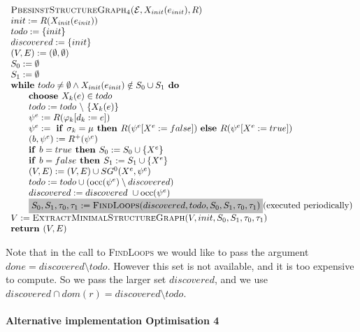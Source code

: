 \documentclass{article}
\newcommand{\Space}{\text{\ }}
\newcommand{\If}{\text{\textbf{if }}}
\newcommand{\Do}{\text{\textbf{ do }}}
\newcommand{\Then}{\text{\textbf{ then }}}
\newcommand{\Else}{\text{\textbf{else }}}
\newcommand{\While}{\text{\textbf{while }}}
\newcommand{\Choose}{\text{\textbf{choose }}}
\newcommand{\Return}{\text{\textbf{return }}}
\begin{document}
\begin{equation*}
\begin{array}{l}
\textsc{PbesinstStructureGraph$_{4}$(}\mathcal{E}, X_{init}(e_{init}), R) \\ 
init:=R(X_{init}(e_{init})) \\
todo:=\{init\} \\
discovered:=\{init\} \\
(V,E) :=(\emptyset ,\emptyset ) \\ 
S_0:= \emptyset \\
S_1:= \emptyset \\
\While todo \neq \emptyset \wedge X_{init}(e_{init}) \notin S_0 \cup S_1 \Do \\ 
\qquad \Choose X_{k}(e)\in todo \\ 
\qquad todo:=todo\ \backslash \ \{X_{k}(e)\} \\ 
\qquad \psi ^{e}:=R(\varphi _{k}[d_{k}:=e]) \\ 
\qquad \psi^e := \Space \If \sigma_k = \mu \Then R(\psi^e[X^e := false])
\Space \Else R(\psi^e[X^e := true]) \\
\qquad (b,\psi^e) := R^+(\psi^e) \\
\qquad \If b = true \Then S_0 := S_0 \cup \{ X^e \} \\
\qquad \If b = false \Then S_1 := S_1 \cup \{ X^e \} \\
\qquad (V,E) := (V,E) \cup SG^{0}(X^{e},\psi ^{e}) \\ 
\qquad todo:=todo\cup (\mathrm{occ}(\psi ^{e})\setminus discovered) \\
\qquad discovered:=discovered\ \cup \mathrm{occ}(\psi ^{e}) \\
\qquad \colorbox{lightgray}{$%
S_0, S_1, \tau_0, \tau_1 := \text{\textsc{FindLoops}}(discovered, todo, S_0, S_1, \tau_0, \tau_1) $} \text{(executed periodically)} \\
V := \textsc{ExtractMinimalStructureGraph}(V, init, S_0, S_1, \tau_0, \tau_1) \\
\Return (V, E)
\end{array}%
\end{equation*}%

Note that in the call to \textsc{FindLoops} we would like to pass the argument $done = discovered \setminus todo$.
However this set is not available, and it is too expensive to compute. So we pass the larger set $discovered$, and we use $discovered \cap dom(r) = discovered \setminus todo$.

\paragraph{Alternative implementation Optimisation 4}
\end{document}
